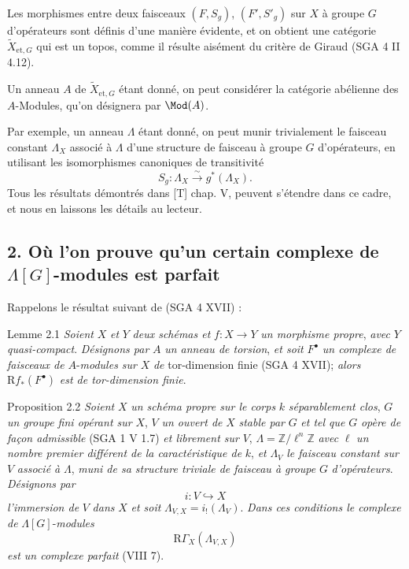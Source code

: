 Les morphismes entre deux faisceaux $(F,S_g)$, $(F',S'_g)$ sur $X$ à groupe $G$ d'opérateurs sont définis d'une manière évidente, et on obtient une catégorie $\widetilde X_{\mathrm{et},G}$ qui est un topos, comme il résulte aisément du critère de Giraud (SGA 4 II 4.12).

Un anneau $A$ de $\widetilde X_{\mathrm{et},G}$ étant donné, on peut considérer la catégorie abélienne des $A$-Modules, qu'on désignera par $\Mod(A)$.

Par exemple, un anneau $\Lambda$ étant donné, on peut munir trivialement le faisceau constant $\Lambda_X$ associé à $\Lambda$ d'une structure de faisceau à groupe $G$ d'opérateurs, en utilisant les isomorphismes canoniques de transitivité
\[
S_g:\Lambda_X\xrightarrow{\sim}g^*(\Lambda_X).
\]
Tous les résultats démontrés dans [T] chap. V, peuvent s'étendre dans ce cadre, et nous en laissons les détails au lecteur.

\subsection*{2. Où l'on prouve qu'un certain complexe de $\Lambda[G]$-modules est parfait}

Rappelons le résultat suivant de (SGA 4 XVII) :

\begin{statement}{Lemme 2.1}
\emph{Soient} $X$ \emph{et} $Y$ \emph{deux schémas et} $f:X\to Y$ \emph{un morphisme propre}, \emph{avec} $Y$ \emph{quasi-compact}. \emph{Désignons par} $A$ \emph{un anneau de torsion}, \emph{et soit} $F^\bullet$ \emph{un complexe de faisceaux de} $A$-\emph{modules sur} $X$ \emph{de} tor-dimension finie (SGA 4 XVII); \emph{alors} $\mathrm{R} f_*(F^\bullet)$ \emph{est de tor-dimension finie}.
\end{statement}

\begin{statement}{Proposition 2.2}
\emph{Soient} $X$ \emph{un schéma propre sur le corps} $k$ \emph{séparablement clos}, $G$ \emph{un groupe fini opérant sur} $X$, $V$ \emph{un ouvert de} $X$ \emph{stable par} $G$ \emph{et tel que} $G$ \emph{opère de façon admissible} (SGA 1 V 1.7) \emph{et librement sur} $V$, $\Lambda=\mathbb{Z}/\ell^n\mathbb{Z}$ \emph{avec} $\ell$ \emph{un nombre premier différent de la caractéristique de} $k$, \emph{et} $\Lambda_V$ \emph{le faisceau constant sur} $V$ \emph{associé à} $\Lambda$, \emph{muni de sa structure triviale de faisceau à groupe} $G$ \emph{d'opérateurs}. \emph{Désignons par}
\[
i:V\hookrightarrow X
\]
\emph{l'immersion de} $V$ \emph{dans} $X$ \emph{et soit} $\Lambda_{V,X}=i_!(\Lambda_V)$. \emph{Dans ces conditions le complexe de} $\Lambda[G]$-\emph{modules}
\[
\mathrm{R}\Gamma_X(\Lambda_{V,X})
\]
\emph{est un complexe parfait} (VIII 7).
\end{statement}

